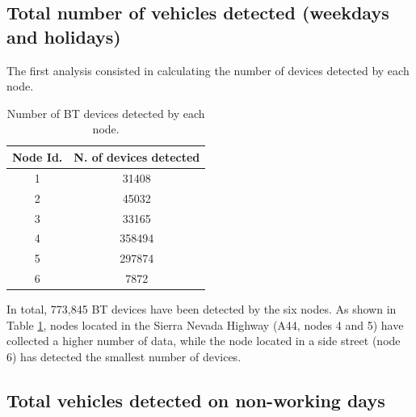 \documentclass[preprint,authoryear,12pt]{elsarticle}
\begin{document}
\subsection{Total number of vehicles detected (weekdays and holidays)}

The first analysis consisted in calculating the number of devices detected by each node.

 \begin{table}
 \begin{center}
 \begin{tabular}{|c|c|}
 \hline
Node Id.  &  N. of devices detected  \\
 \hline
    1     &    31408  \\
 \hline
    2     &    45032  \\
 \hline
    3     &    33165  \\
 \hline
    4     &    358494  \\
 \hline
    5     &    297874  \\
 \hline
    6     &    7872  \\
 \hline
 \end{tabular}
 \end{center}
 \caption{Number of BT devices detected by each node.
 \label{VehiculosTotales}}
 \end{table}


In total, 773,845 BT devices have been detected by the six nodes.
As shown in Table \ref{VehiculosTotales}, nodes located in the Sierra Nevada Highway (A44, nodes 4 and 5) have collected a higher number of data, while the node located in a side street (node 6) has detected the smallest number of devices.


\subsection{Total vehicles detected on non-working days}
\end{document}
